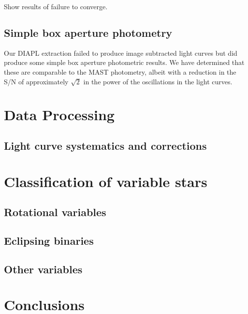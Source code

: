 Show results of failure to converge.


\subsection{Simple box aperture photometry}
Our DIAPL extraction failed to produce image subtracted light curves but did produce some simple box aperture photometric results. We have determined that these are comparable to the MAST photometry, albeit with a reduction in the S/N of approximately $\sqrt2$ in the power of the oscillations in the light curves.

\section{Data Processing}
\subsection{Light curve systematics and corrections}


\section{Classification of variable stars}


\subsection{Rotational variables}

\subsection{Eclipsing binaries}

\subsection{Other variables}

\section{Conclusions}